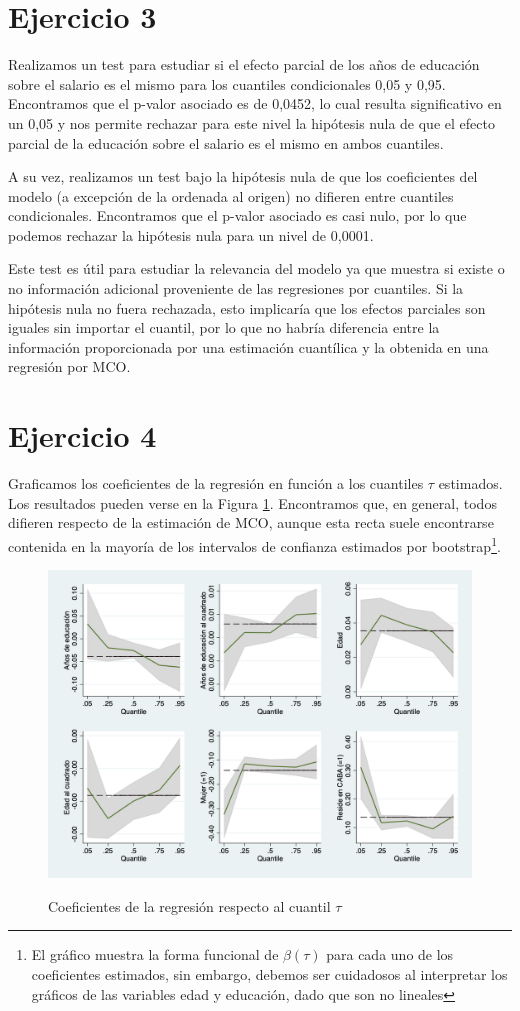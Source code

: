 \documentclass[12pt]{article}
\begin{document}
\section*{Ejercicio 3}

Realizamos un test para estudiar si el efecto parcial de los años de educación sobre el salario es el mismo para los cuantiles condicionales 0,05 y 0,95. Encontramos que el p-valor asociado es de 0,0452, lo cual resulta significativo en un 0,05 y nos permite rechazar para este nivel la hipótesis nula de que el efecto parcial de la educación sobre el salario es el mismo en ambos cuantiles.

A su vez, realizamos un test bajo la hipótesis nula de que los coeficientes del modelo (a excepción de la ordenada al origen) no difieren entre cuantiles condicionales. Encontramos que el p-valor asociado es casi nulo, por lo que podemos rechazar la hipótesis nula para un nivel de 0,0001. 

Este test es útil para estudiar la relevancia del modelo ya que muestra si existe o no información adicional proveniente de las regresiones por cuantiles. Si la hipótesis nula no fuera rechazada, esto implicaría que los efectos parciales son iguales sin importar el cuantil, por lo que no habría diferencia entre la información proporcionada por una estimación cuantílica y la obtenida en una regresión por MCO.

\section*{Ejercicio 4}

Graficamos los coeficientes de la regresión en función a los cuantiles $\tau$ estimados. Los resultados pueden verse en la Figura \ref{fig: 4}. Encontramos que, en general, todos difieren respecto de la estimación de MCO, aunque esta recta suele encontrarse contenida en la mayoría de los intervalos de confianza estimados por bootstrap\footnote{El gráfico muestra la forma funcional de $\beta(\tau)$ para cada uno de los coeficientes estimados, sin embargo, debemos ser cuidadosos al interpretar los gráficos de las variables edad y educación, dado que son no lineales}.  

\begin{figure}[H]
	\caption{Coeficientes de la regresión respecto al cuantil $\tau$}
	\centering
	\includegraphics[width=0.8\linewidth]{4.png}
	\label{fig: 4}
\end{figure}
\end{document}
